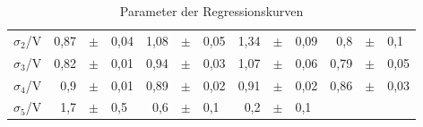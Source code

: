 \begin{table}[h]
\begin{tabular}{c | r p{0.05cm} l r p{0.05cm} l r p{0.05cm} l r p{0.05cm} l}
      $\sigma_2$/V &         0,87         &$\pm$ & 0,04     &   1,08          &$\pm$ & 0,05    & 1,34  & $\pm$ &  0,09  &  0,8  & $\pm$  & 0,1 \\ 
      $\sigma_3$/V &         0,82         &$\pm$ & 0,01      &   0,94         &$\pm$ & 0,03    & 1,07  & $\pm$ & 0,06   &   0,79 & $\pm$  & 0,05 \\ 
      $\sigma_4$/V &        0,9          &$\pm$ & 0,01    &   0,89         &$\pm$ & 0,02    &  0,91 & $\pm$ &  0,02  &  0,86  & $\pm$  & 0,03 \\ 
      $\sigma_5$/V &         1,7          &$\pm$ & 0,5      &   0,6         &$\pm$ & 0,1     & 0,2  & $\pm$ & 0,1   &    &   &  \\ 
      \bottomrule
    \end{tabular}
    \caption{Parameter der Regressionskurven}
    \label{tab:fh_parameter_1}
  \end{table}


